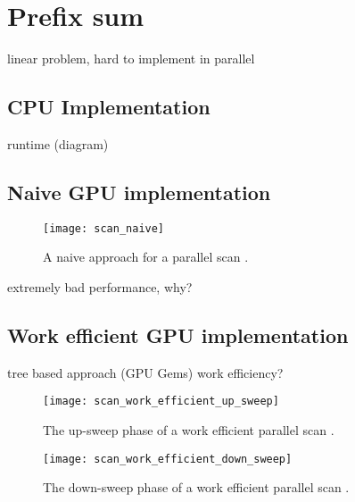 \section{Prefix sum}
\label{sec:prefix_sum}

linear problem, hard to implement in parallel

\subsection{CPU Implementation}






runtime (diagram)

\subsection{Naive GPU implementation}

\begin{figure}
\centering
\texttt{[image: scan\_naive]}
\caption{A naive approach for a parallel scan \cite{gpu_gems_3_chapter_39}.}
\label{fig:scan_naive}
\end{figure}





extremely bad performance, why?

\subsection{Work efficient GPU implementation}

tree based approach (GPU Gems) work efficiency?

\begin{figure}
\centering
\texttt{[image: scan\_work\_efficient\_up\_sweep]}
\caption{The up-sweep phase of a work efficient parallel scan \cite{gpu_gems_3_chapter_39}.}
\label{fig:scan_work_efficient_up_sweep}
\end{figure}

\begin{figure}
\centering
\texttt{[image: scan\_work\_efficient\_down\_sweep]}
\caption{The down-sweep phase of a work efficient parallel scan \cite{gpu_gems_3_chapter_39}.}
\label{fig:scan_work_efficient_down_sweep}
\end{figure}



